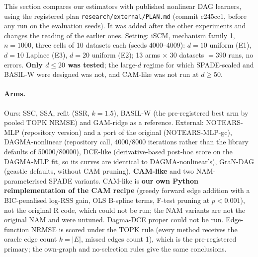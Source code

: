 This section compares our estimators with published nonlinear DAG learners, using the registered plan \texttt{research/external/PLAN.md} (commit c245cc1, before any run on the evaluation seeds). It was added after the other experiments and changes the reading of the earlier ones. Setting: iSCM, mechanism family 1, $n=1000$, three cells of 10 datasets each (seeds 4000--4009): $d=10$ uniform (E1), $d=10$ Laplace (E3), $d=20$ uniform (E2); 13 arms $\times$ 30 datasets $=390$ runs, no errors. \textbf{Only $d\le20$ was tested}; the large-$d$ regime for which SPADE-scaled and BASIL-W were designed was not, and CAM-like was not run at $d\ge50$.

\paragraph{Arms.} Ours: SSC, SSA, refit (SSR, $k=1.5$), BASIL-W (the pre-registered best arm by pooled TOPK NRMSE) and GAM-ridge as a reference. External: NOTEARS-MLP (repository version) and a port of the original (NOTEARS-MLP-gc), DAGMA-nonlinear (repository call, 4000/8000 iterations rather than the library defaults of 50000/80000), DCE-like (derivative-based post-hoc score on the DAGMA-MLP fit, so its curves are identical to DAGMA-nonlinear's), GraN-DAG (gcastle defaults, without CAM pruning), \textbf{CAM-like} and two NAM-parameterised SPADE variants. CAM-like is \textbf{our own Python reimplementation of the CAM recipe} (greedy forward edge addition with a BIC-penalised log-RSS gain, OLS B-spline terms, F-test pruning at $p<0.001$), not the original R code, which could not be run; the NAM variants are not the original NAM and were untuned. Dagma-DCE proper could not be run. Edge-function NRMSE is scored under the TOPK rule (every method receives the oracle edge count $k=|E|$, missed edges count 1), which is the pre-registered primary; the own-graph and no-selection rules give the same conclusions.

\begin{table}[t]
\centering
\caption{External baselines against our estimators, $d\le20$ (research/external).}
\label{tab:external}

\end{table}

